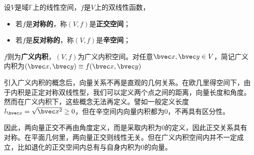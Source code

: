 \begin{definition}{}
设$V$是域$\mathbb F$上的线性空间，$f$是$V$上的双线性函数，
\begin{itemize}
\item 若$f$是\textbf{对称的}，称$(V,f)$是\textbf{正交空间}；
\item 若$f$是\textbf{反对称的}，称$(V,f)$是\textbf{辛空间}；
\end{itemize}
$f$则为\textbf{广义内积}，$(V,f)$为广义内积空间。对任意$\bvec x,\bvec y\in V$，简记广义内积为$(\bvec x,\bvec y)\equiv f(\bvec x,\bvec y)$
\end{definition}
引入广义内积的概念后，向量关系不再是直观的几何关系。在欧几里得空间下，由于内积是正定对称双线性型，我们可以定义两个点之间的距离，向量长度和角度。然而在广义内积下，这些概念无法再定义。譬如一般定义长度$l_{\bvec x}=\sqrt{\bvec x^2}\ge 0$，但在辛空间内向量内积都为0，不再具有区分性。

因此，两向量正交不再由角度定义，而是采取内积为$0$的定义，因此正交关系具有对称。在平面几何里，两向量正交则线性无关。但在广义内积空间内并不一定成立，比如退化的正交空间内总有与自身内积为0的向量。
